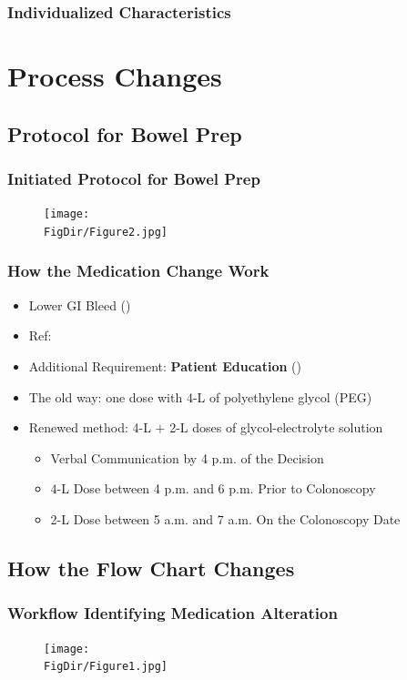 \documentclass[pdflatex]{beamer}
\begin{document}
\begin{frame}
\frametitle{Individualized Characteristics}

\end{frame}

\section{Process Changes}
\subsection{Protocol for Bowel Prep}
\begin{frame}
\frametitle{Initiated Protocol for Bowel Prep}
    \begin{figure}
        \centerline{\texttt{[image: \\FigDir/Figure2.jpg]}}
    \end{figure}
\end{frame}

\begin{frame}
\frametitle{How the Medication Change Work}

\begin{itemize}
\item Lower GI Bleed (\cite{Saltzman2015-ir})
\item Ref: \cite{American_Society_of_Anesthesiologists_Committee2011-sw}
\medskip
\item Additional Requirement: {\bf Patient Education} (\cite{Lai2009-xr})
\medskip
\item The old way: one dose with 4-L of polyethylene glycol (PEG)
\item Renewed method: 4-L $+$ 2-L doses of glycol-electrolyte solution
\begin{itemize}
  \item Verbal Communication by 4 p.m. of the Decision
  \item 4-L Dose between 4 p.m. and 6 p.m. Prior to Colonoscopy
  \item 2-L Dose between 5 a.m. and 7 a.m. On the Colonoscopy Date
\end{itemize}
\end{itemize}
\end{frame}

\subsection{How the Flow Chart Changes}
\begin{frame}
\frametitle{Workflow Identifying Medication Alteration}
    \begin{figure}
        \centerline{\texttt{[image: \\FigDir/Figure1.jpg]}}
    \end{figure}
\end{frame}
\end{document}
